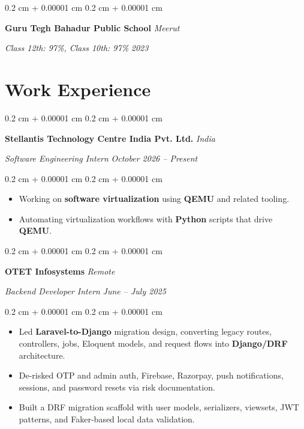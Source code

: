 \documentclass[10pt, letterpaper]{article}
\newenvironment{highlights}{
    \small
    \begin{itemize}[
        topsep=0.02 cm,
        parsep=0.015 cm,
        partopsep=0pt,
        itemsep=0.015 cm,
        leftmargin=0.4 cm + 10pt
    ]
}{
    \end{itemize}
} %
\newenvironment{onecolentry}{
    \begin{adjustwidth}{
        0.2 cm + 0.00001 cm
    }{
        0.2 cm + 0.00001 cm
    }
}{
    \end{adjustwidth}
} %
\begin{document}
        \vspace{0.04 cm}

        \begin{onecolentry}
            \textbf{Guru Tegh Bahadur Public School} \hfill \textit{Meerut}

            \textit{Class 12th: 97\%, Class 10th: 97\%} \hfill \textit{2023}
        \end{onecolentry}


    \section{Work Experience}

        \begin{onecolentry}
            \textbf{Stellantis Technology Centre India Pvt. Ltd.} \hfill \textit{India}

            \textit{Software Engineering Intern} \hfill \textit{October 2026 -- Present}
        \end{onecolentry}

        \vspace{0.02 cm}
        \begin{onecolentry}
            \begin{highlights}
                \item Working on \textbf{software virtualization} using \textbf{QEMU} and related tooling.
                \item Automating virtualization workflows with \textbf{Python} scripts that drive \textbf{QEMU}.
            \end{highlights}
        \end{onecolentry}

        \vspace{0.04 cm}

        \begin{onecolentry}
            \textbf{OTET Infosystems} \hfill \textit{Remote}

            \textit{Backend Developer Intern} \hfill \textit{June -- July 2025}
        \end{onecolentry}

        \vspace{0.02 cm}
        \begin{onecolentry}
            \begin{highlights}
                \item Led \textbf{Laravel-to-Django} migration design, converting legacy routes, controllers, jobs, Eloquent models, and request flows into \textbf{Django/DRF} architecture.
                \item De-risked OTP and admin auth, Firebase, Razorpay, push notifications, sessions, and password resets via risk documentation.
                \item Built a DRF migration scaffold with user models, serializers, viewsets, JWT patterns, and Faker-based local data validation.
            \end{highlights}
        \end{onecolentry}
\end{document}
